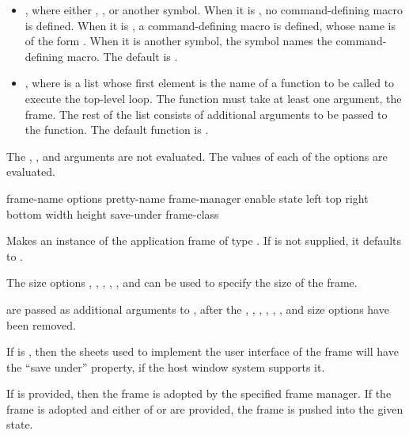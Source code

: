 \begin{itemize}
\item {} , where  either ,
, or another symbol.  When it is , no command-defining macro is
defined.  When it is , a command-defining macro is defined, whose name is
of the form .  When it is another symbol, the
symbol names the command-defining macro.  The default is .

\item {} , where  is a list whose first
element is the name of a function to be called to execute the top-level loop.
The function must take at least one argument, the frame.  The rest of the list
consists of additional arguments to be passed to the function.  The default
function is .
\end{itemize}

The , , and  arguments are not evaluated.
The values of each of the options are evaluated.


 {frame-name \rest options
                                 \key pretty-name 
                                      frame-manager enable state 
                                      left top right bottom width height
                                      save-under frame-class
                                 \allow} 

Makes an instance of the application frame of type .  If
 is not supplied, it defaults to .

The size options , , , , ,
and  can be used to specify the size of the frame.

 are passed as additional arguments to , after
the , , , ,
, , and size options have been removed.

If  is , then the sheets used to implement the user
interface of the frame will have the ``save under'' property, if the host window
system supports it.

If  is provided, then the frame is adopted by the specified
frame manager.  If the frame is adopted and either of  or
 are provided, the frame is pushed into the given state.

